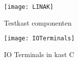 \begin{figure}[H]
	\centering
	\texttt{[image: LINAK]}
	\label{fig:LINAK}
	\caption{Testkast componenten}
\end{figure}

\begin{figure}[H]
	\centering
	\texttt{[image: IOTerminals]}
	\label{fig:IOTerminals}
	\caption{IO Terminals in kast C}
\end{figure}